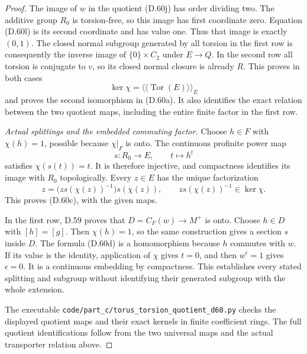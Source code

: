 \begin{proof}
The image of $w$ in the quotient (D.60j)
has order dividing two.
The additive group $R_0$ is torsion-free,
so this image has first coordinate zero.
Equation (D.60l) is its second coordinate
and has value one. Thus that image is
exactly $(0,1)$.
The closed normal subgroup generated by
all torsion in the first row is consequently
the inverse image of $\{0\}\times C_2$ under
$E\to Q$.
In the second row all torsion is conjugate
to $v$, so its closed normal closure is
already $R$.
This proves in both cases
\[
 \ker\chi=
       \langle\!\langle\operatorname{Tor}(E)\rangle\!\rangle_E
                                                               \tag{D.60n}
\]
and proves the second isomorphism in (D.60a).
It also identifies the exact relation between
the two quotient maps, including the entire
finite factor in the first row.

\emph{Actual splittings and the embedded commuting factor.}
Choose $h\in F$ with $\chi(h)=1$, possible
because $\chi|_F$ is onto.
The continuous profinite power map
\[
                 s:R_0\longrightarrow E,\qquad t\longmapsto h^t
                                                               \tag{D.60o}
\]
satisfies $\chi(s(t))=t$.
It is therefore injective, and compactness
identifies its image with $R_0$ topologically.
Every $z\in E$ has the unique factorization
\[
                  z=\bigl(zs(\chi(z))^{-1}\bigr)s(\chi(z)),
 \qquad zs(\chi(z))^{-1}\in\ker\chi .
\]
This proves (D.60c), with the given maps.

In the first row, D.59 proves that
$D=C_F(w)\to M^+$ is onto.
Choose $h\in D$ with $[h]=[g]$.
Then $\chi(h)=1$, so the same construction
gives a section $s$ inside $D$.
The formula (D.60d) is a homomorphism
because $h$ commutes with $w$.
If its value is the identity, application
of $\chi$ gives $t=0$, and then
$w^\epsilon=1$ gives $\epsilon=0$.
It is a continuous embedding by compactness.
This establishes every stated splitting and
subgroup without identifying their generated
subgroup with the whole extension.

The executable
\texttt{code/part\_c/torus\_torsion\_quotient\_d60.py}
checks the displayed quotient maps and their
exact kernels in finite coefficient rings.
The full quotient identifications follow from
the two universal maps and the actual
transporter relation above.
\end{proof}
